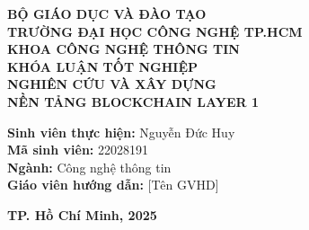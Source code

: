 \documentclass[13pt,a4paper,oneside]{report}
\begin{document}
\begin{titlepage}
    \centering
    \textbf{\large BỘ GIÁO DỤC VÀ ĐÀO TẠO} \\
    \textbf{\large TRƯỜNG ĐẠI HỌC CÔNG NGHỆ TP.HCM} \\
    \textbf{\large KHOA CÔNG NGHỆ THÔNG TIN} \\
    \vspace{3cm}
    \textbf{\large KHÓA LUẬN TỐT NGHIỆP} \\
    \vspace{1.5cm}
    \textbf{\Large NGHIÊN CỨU VÀ XÂY DỰNG\\NỀN TẢNG BLOCKCHAIN LAYER 1} \\
    \vspace{3cm}
    \begin{flushleft}
        \hspace{4cm}\textbf{Sinh viên thực hiện:} Nguyễn Đức Huy \\
        \hspace{4cm}\textbf{Mã sinh viên:} 22028191 \\
        \hspace{4cm}\textbf{Ngành:} Công nghệ thông tin \\
        \hspace{4cm}\textbf{Giáo viên hướng dẫn:} [Tên GVHD]
    \end{flushleft}
    \vfill
    \textbf{TP. Hồ Chí Minh, 2025}
\end{titlepage}






\tableofcontents
\listoffigures
\listoftables

\clearpage

\setcounter{page}{1}










\end{document}
